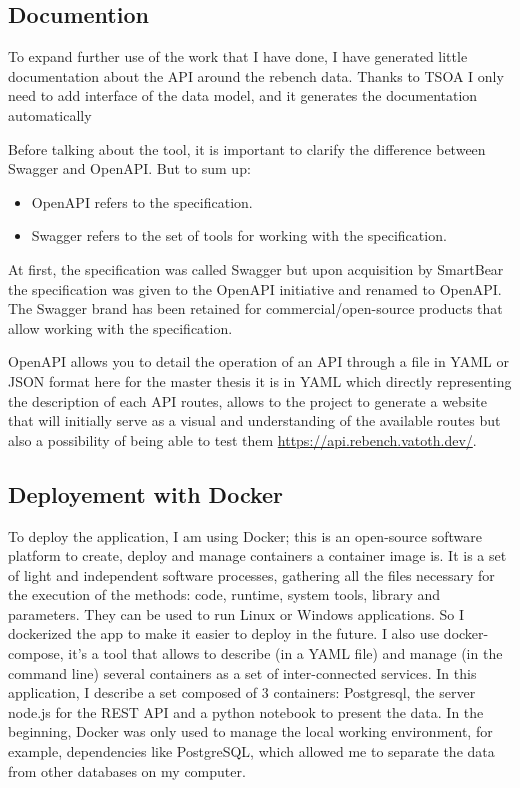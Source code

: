 \documentclass{article}
\begin{document}
\subsection{Documention}

To expand further use of the work that I have done, I have generated little documentation about the API around the rebench data.
Thanks to TSOA I only need to add interface of the data model, and it generates the documentation automatically

Before talking about the tool, it is important to clarify the difference between Swagger and OpenAPI. But to sum up:

\begin{itemize}
    \item OpenAPI refers to the specification.
    \item Swagger refers to the set of tools for working with the specification.
\end{itemize}

At first, the specification was called Swagger but upon acquisition by SmartBear the specification was given to the OpenAPI initiative and renamed to OpenAPI. The Swagger brand has been retained for commercial/open-source products that allow working with the specification.

OpenAPI allows you to detail the operation of an API through a file in YAML or JSON format here for the master thesis it is in YAML which directly representing the description of each API routes, allows to the project to generate a website that will initially serve as a visual and understanding of the available routes but also a possibility of being able to test them \url{https://api.rebench.vatoth.dev/}.



\subsection{Deployement with Docker}

To deploy the application, I am using Docker; this is an open-source software platform to create, deploy and manage containers a container image is. It is a set of light and independent software processes, gathering all the files necessary for the execution of the methods: code, runtime, system tools, library and parameters. They can be used to run Linux or Windows applications. So I dockerized the app to make it easier to deploy in the future. I also use docker-compose, it's a tool that allows to describe (in a YAML file) and manage (in the command line) several containers as a set of inter-connected services. In this application, I describe a set composed of 3 containers: Postgresql, the server node.js for the REST API and a python notebook to present the data. In the beginning, Docker was only used to manage the local working environment, for example, dependencies like PostgreSQL, which allowed me to separate the data from other databases on my computer.
\end{document}

